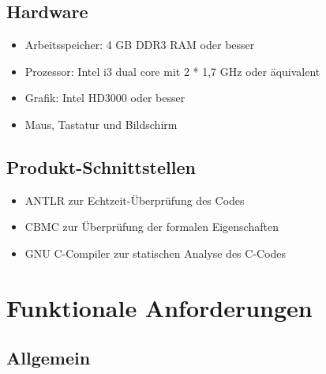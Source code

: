 \documentclass[a4paper]{scrreprt}
\begin{document}
\section{Hardware}
\begin{itemize}
\item Arbeitsspeicher: 4 GB DDR3 RAM oder besser
\item Prozessor: Intel i3 dual core mit 2 * 1,7 GHz oder äquivalent
\item Grafik: Intel HD3000 oder besser
\item Maus, Tastatur und Bildschirm
\end{itemize}

\section{Produkt-Schnittstellen}
\begin{itemize}
\item ANTLR zur Echtzeit-Überprüfung des Codes
\item CBMC zur Überprüfung der formalen Eigenschaften
\item GNU C-Compiler zur statischen Analyse des C-Codes
\end{itemize}

\chapter{Funktionale Anforderungen}
\section{Allgemein}
\end{document}
